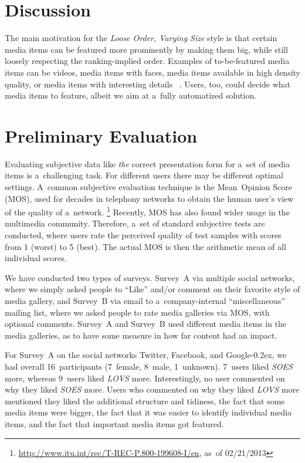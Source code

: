 \documentclass{sig-alternate}
\DeclareRobustCommand{\googleplus}{\mbox{Google\hspace{0em}\raisebox{.28ex}{\tiny\bf +}\kern-0.2ex}\xspace}
\newcommand{\inlinelistingsize}{\fontsize{8pt}{11pt}}
\let\oldurl\url
\renewcommand{\url}[1]{\inlinelistingsize\oldurl{#1}}
\begin{document}
\section{Discussion}

The main motivation for the \emph{Loose Order, Varying Size} style
is that certain media items can be featured more prominently
by making them big, while still loosely respecting the ranking-implied order.
Examples of to-be-featured media items can be videos,
media items with faces, media items available in high density quality,
or media items with interesting details~%
\cite{suh2003thumbnail}.
Users, too, could decide what media items to feature,
albeit we aim at a~fully automatized solution.

\section{Preliminary Evaluation}

Evaluating subjective data like \emph{the} correct presentation form
for a~set of media items is a~challenging task.
For different users there may be different optimal settings.
A~common subjective evaluation technique
is the Mean~Opinion Score (MOS),
used for decades in telephony networks to
obtain the human user's view of the quality of a~network.%
\footnote{\url{http://www.itu.int/rec/T-REC-P.800-199608-I/en},
as~of 02/21/2013}
Recently, MOS has also found wider usage in the multimedia community.
Therefore, a~set of standard subjective tests are conducted,
where users rate the perceived quality of test samples
with scores from 1 (worst) to 5 (best).
The actual MOS is then the arithmetic mean of all individual scores.

We have conducted two types of surveys. 
Survey~A via multiple social networks, where we simply asked people to ``Like''
and/or comment on their favorite style of media gallery,
and Survey~B via email to a~company-internal ``miscellaneous'' mailing list,
where we asked people to rate media galleries via MOS, with optional comments. 
Survey~A and Survey~B used different media items in the media galleries,
as to have some measure in how far content had an impact.

For Survey~A on the social networks Twitter, Facebook,
and \googleplus, we had overall 16~participants (7~female, 8~male, 1~unknown).
7~users liked \emph{SOES} more,
whereas 9~users liked \emph{LOVS} more.
Interestingly, no user commented on why they liked \emph{SOES} more.
Users who commented on why they liked \emph{LOVS} more mentioned
they liked the additional structure and tidiness,
the fact that some media items were bigger,
the fact that it was easier to identify individual media items,
and the fact that important media items got featured.
\end{document}
